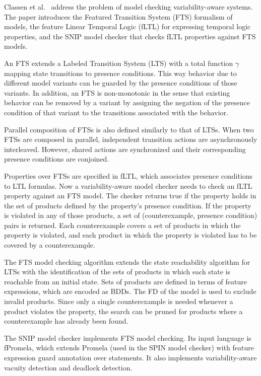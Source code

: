 \documentclass[11pt]{article}
\begin{document}
Classen et al.~\cite{Classen:2013} address the problem of model checking variability-aware systems. The paper introduces the Featured Transition System (FTS) formalism of models, the feature Linear Temporal Logic (fLTL) for expressing temporal logic properties, and the SNIP model checker that checks fLTL properties against FTS models.

An FTS extends a Labeled Transition System (LTS) with a total function $\gamma$ mapping state transitions to presence conditions. This way behavior due to different model variants can be guarded by the presence conditions of those variants. In addition, an FTS is non-monotonic in the sense that existing behavior can be removed by a variant by assigning the negation of the presence condition of that variant to the transitions associated with the behavior.

Parallel composition of FTSs is also defined similarly to that of LTSs. When two FTSs are composed in parallel, independent transition actions are asynchronously interleaved. However, shared actions are synchronized and their corresponding presence conditions are conjoined. 

Properties over FTSs are specified in fLTL, which associates presence conditions to LTL formulas. Now a variability-aware model checker needs to check an fLTL property against an FTS model. The checker returns true if the property holds in the set of products defined by the property's presence condition. If the property is violated in any of those products, a set of (counterexample, presence condition) pairs is returned. Each counterexample covers a set of products in which the property is violated, and each product in which the property is violated  has to be covered by a counterexample.

The FTS model checking algorithm extends the state reachability algorithm for LTSs with the identification of the sets of products in which each state is reachable from an initial state. Sets of products are defined in terms of feature expressions, which are encoded as BDDs. The FD of the model is used to exclude invalid products. Since only a single counterexample is needed whenever a product violates the property, the search can be pruned for products where a counterexample has already been found.

The SNIP model checker implements FTS model checking. Its input language is fPromela, which extends Promela (used in the SPIN model checker) with feature expression guard annotation over statements. It also implements variability-aware vacuity detection and deadlock detection.
\end{document}
